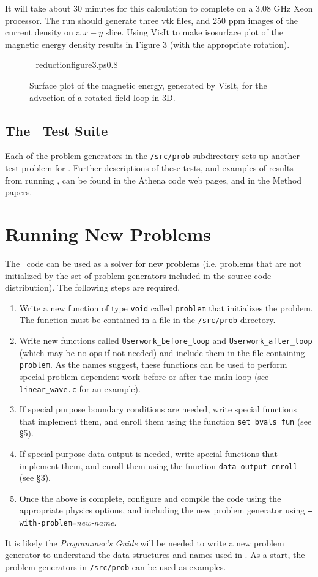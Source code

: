 It will take about 30 minutes for this calculation to complete on a 3.08 GHz
Xeon processor.  The run should generate three vtk files, and 250 ppm
images of the current density on a $x-y$ slice.  Using VisIt to make isosurface
plot of the magnetic energy density results in Figure 3 (with the
appropriate rotation).

\begin{figure}[htb!]
\plotone_reduction{figure3.ps}{0.8}
\caption{Surface plot of the magnetic energy, generated by VisIt, for
the advection of a rotated field loop in 3D.}
\end{figure}

\subsection{The \ath\ Test Suite}

Each of the problem generators in the {\tt /src/prob} subdirectory sets
up another test problem for \ath.  Further descriptions of these tests, and
examples of results from running \ath, can be found in the Athena code 
web pages, and in the Method papers.
  
\section{Running New Problems}

The \ath\ code can be used as a solver for new problems (i.e. problems that
are not initialized by the set of problem generators included in the source
code distribution).  The following steps are required.
\begin{enumerate}
\item Write a new function of type {\tt void} called {\tt problem} that initializes the problem.
The function must be contained in a file in the {\tt /src/prob} directory.
\item Write new functions called {\tt Userwork\_before\_loop} and 
{\tt Userwork\_after\_loop} (which may be no-ops if not needed) and include
them in the file containing {\tt problem}.  As the names suggest, these
functions can be used to perform special problem-dependent work before or 
after the main loop (see {\tt linear\_wave.c} for an example).
\item If special purpose boundary conditions are needed, write special
functions that implement them, and enroll them using the function
{\tt set\_bvals\_fun} (see \S 5).
\item If special purpose data output is needed, write special
functions that implement them, and enroll them using the function
{\tt data\_output\_enroll} (see \S 3).
\item Once the above is complete, configure and compile the code
using the appropriate physics options, and including the new problem
generator using {\tt --with-problem=}{\em new-name}.
\end{enumerate}

It is likely the {\em Programmer's Guide} will be needed to write a 
new problem generator to understand the data structures and names used
in \ath.  As a start, the problem generators in {\tt /src/prob} can be used
as examples.


